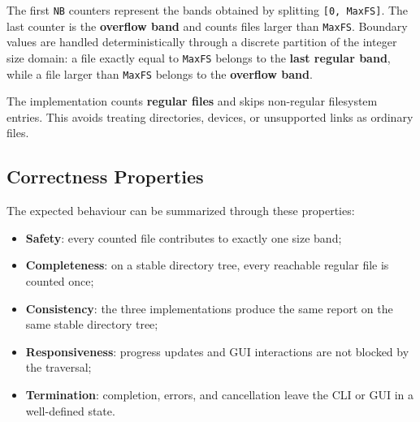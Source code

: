The first \texttt{NB} counters represent the bands obtained by splitting
\texttt{[0, MaxFS]}. The last counter is the \textbf{overflow band} and counts
files larger than \texttt{MaxFS}. Boundary values are handled
deterministically through a discrete partition of the integer size domain:
a file exactly equal to \texttt{MaxFS} belongs to the \textbf{last regular
band}, while a file larger than \texttt{MaxFS} belongs to the
\textbf{overflow band}.

The implementation counts \textbf{regular files} and skips non-regular
filesystem entries. This avoids treating directories, devices, or unsupported
links as ordinary files.

\subsection{Correctness Properties}

The expected behaviour can be summarized through these properties:

\begin{itemize}
  \item \textbf{Safety}: every counted file contributes to exactly one size
  band;
  \item \textbf{Completeness}: on a stable directory tree, every reachable
  regular file is counted once;
  \item \textbf{Consistency}: the three implementations produce the same report
  on the same stable directory tree;
  \item \textbf{Responsiveness}: progress updates and GUI interactions are not
  blocked by the traversal;
  \item \textbf{Termination}: completion, errors, and cancellation leave the CLI
  or GUI in a well-defined state.
\end{itemize}
